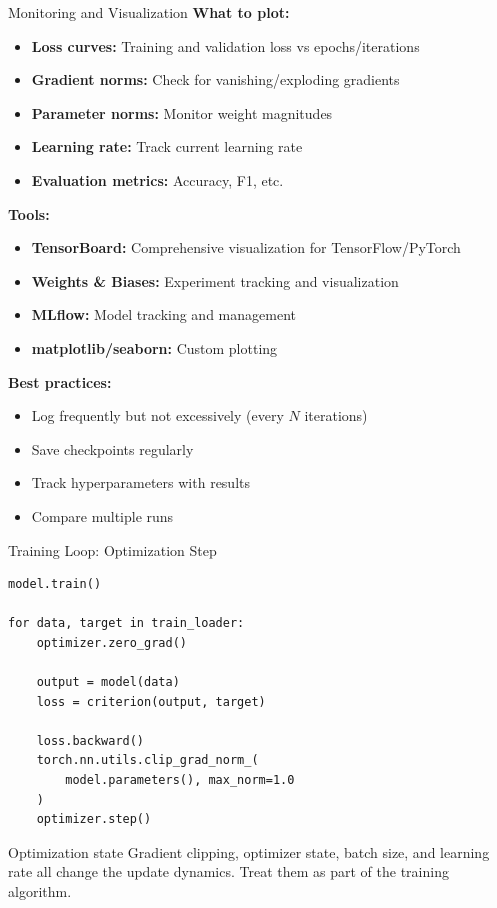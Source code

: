 \documentclass[aspectratio=169]{beamer}
\begin{document}
\begin{frame}{Monitoring and Visualization}
  \textbf{What to plot:}
  \begin{itemize}
    \item \textbf{Loss curves:} Training and validation loss vs epochs/iterations
    \item \textbf{Gradient norms:} Check for vanishing/exploding gradients
    \item \textbf{Parameter norms:} Monitor weight magnitudes
    \item \textbf{Learning rate:} Track current learning rate
    \item \textbf{Evaluation metrics:} Accuracy, F1, etc.
  \end{itemize}

  \vspace{0.5em}

  \textbf{Tools:}
  \begin{itemize}
    \item \textbf{TensorBoard:} Comprehensive visualization for TensorFlow/PyTorch
    \item \textbf{Weights \& Biases:} Experiment tracking and visualization
    \item \textbf{MLflow:} Model tracking and management
    \item \textbf{matplotlib/seaborn:} Custom plotting
  \end{itemize}

  \vspace{0.5em}

  \textbf{Best practices:}
  \begin{itemize}
    \item Log frequently but not excessively (every $N$ iterations)
    \item Save checkpoints regularly
    \item Track hyperparameters with results
    \item Compare multiple runs
  \end{itemize}
\end{frame}

\begin{frame}[fragile]{Training Loop: Optimization Step}
\begin{lstlisting}[style=code,basicstyle=\ttfamily\small]
model.train()

for data, target in train_loader:
    optimizer.zero_grad()

    output = model(data)
    loss = criterion(output, target)

    loss.backward()
    torch.nn.utils.clip_grad_norm_(
        model.parameters(), max_norm=1.0
    )
    optimizer.step()
\end{lstlisting}

\begin{block}{Optimization state}
Gradient clipping, optimizer state, batch size, and learning rate all change the update dynamics. Treat them as part of the training algorithm.
\end{block}
\end{frame}
\end{document}
